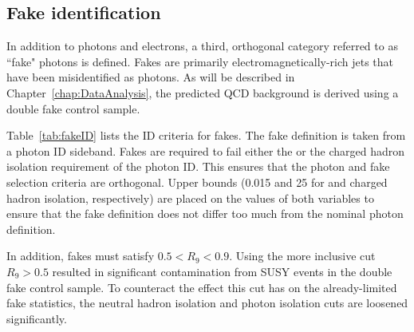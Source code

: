 \subsection{Fake identification}
\label{sec:fakeID}
In addition to photons and electrons, a third, orthogonal category referred to as ``fake" photons is defined. 
Fakes are primarily electromagnetically-rich jets that have been misidentified as photons. As will be described in Chapter~\ref{chap:DataAnalysis},
the predicted QCD background is derived using a double fake control sample.

Table~\ref{tab:fakeID} lists the ID criteria for fakes.
The fake definition is taken from a photon ID sideband. Fakes are required to
fail either the \sigmaietaieta or the charged hadron isolation requirement of the photon ID. 
This ensures that the photon and fake selection criteria are orthogonal. Upper bounds
(0.015 and 25 for \sigmaietaieta and charged hadron isolation, respectively)
are placed on the values of both variables to ensure that the fake definition does not differ too much 
from the nominal photon definition. 

In addition, fakes must satisfy $0.5 < R_9 < 0.9$. Using the more inclusive cut $R_9 > 0.5$
resulted in significant contamination from SUSY events in the double fake control sample. To
counteract the effect this cut has on the already-limited fake statistics, the
neutral hadron isolation and photon isolation cuts are loosened significantly.

